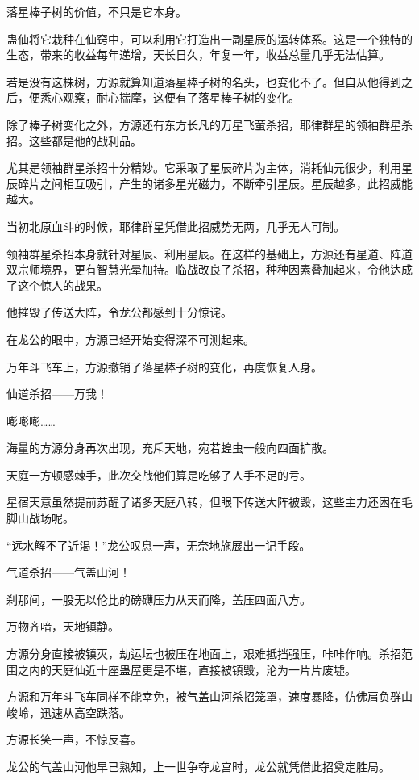 \begin{this_body}
落星棒子树的价值，不只是它本身。

蛊仙将它栽种在仙窍中，可以利用它打造出一副星辰的运转体系。这是一个独特的生态，带来的收益每年递增，天长日久，年复一年，收益总量几乎无法估算。

若是没有这株树，方源就算知道落星棒子树的名头，也变化不了。但自从他得到之后，便悉心观察，耐心揣摩，这便有了落星棒子树的变化。

除了棒子树变化之外，方源还有东方长凡的万星飞萤杀招，耶律群星的领袖群星杀招。这些都是他的战利品。

尤其是领袖群星杀招十分精妙。它采取了星辰碎片为主体，消耗仙元很少，利用星辰碎片之间相互吸引，产生的诸多星光磁力，不断牵引星辰。星辰越多，此招威能越大。

当初北原血斗的时候，耶律群星凭借此招威势无两，几乎无人可制。

领袖群星杀招本身就针对星辰、利用星辰。在这样的基础上，方源还有星道、阵道双宗师境界，更有智慧光晕加持。临战改良了杀招，种种因素叠加起来，令他达成了这个惊人的战果。

他摧毁了传送大阵，令龙公都感到十分惊诧。

在龙公的眼中，方源已经开始变得深不可测起来。

万年斗飞车上，方源撤销了落星棒子树的变化，再度恢复人身。

仙道杀招——万我！

嘭嘭嘭……

海量的方源分身再次出现，充斥天地，宛若蝗虫一般向四面扩散。

天庭一方顿感棘手，此次交战他们算是吃够了人手不足的亏。

星宿天意虽然提前苏醒了诸多天庭八转，但眼下传送大阵被毁，这些主力还困在毛脚山战场呢。

“远水解不了近渴！”龙公叹息一声，无奈地施展出一记手段。

气道杀招——气盖山河！

刹那间，一股无以伦比的磅礴压力从天而降，盖压四面八方。

万物齐喑，天地镇静。

方源分身直接被镇灭，劫运坛也被压在地面上，艰难抵挡强压，咔咔作响。杀招范围之内的天庭仙近十座蛊屋更是不堪，直接被镇毁，沦为一片片废墟。

方源和万年斗飞车同样不能幸免，被气盖山河杀招笼罩，速度暴降，仿佛肩负群山峻岭，迅速从高空跌落。

方源长笑一声，不惊反喜。

龙公的气盖山河他早已熟知，上一世争夺龙宫时，龙公就凭借此招奠定胜局。


\end{this_body}
